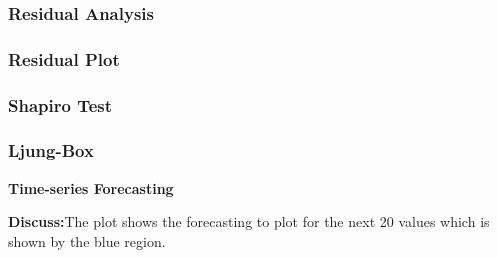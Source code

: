 \documentclass[
  onepage,
  openany]{scrbook}
\newenvironment{Shaded}{}{}
\newcommand{\AttributeTok}[1]{\textcolor[rgb]{0.49,0.56,0.16}{#1}}
\newcommand{\CommentTok}[1]{\textcolor[rgb]{0.38,0.63,0.69}{\textit{#1}}}
\newcommand{\DecValTok}[1]{\textcolor[rgb]{0.25,0.63,0.44}{#1}}
\newcommand{\FunctionTok}[1]{\textcolor[rgb]{0.02,0.16,0.49}{#1}}
\newcommand{\NormalTok}[1]{#1}
\newcommand{\OtherTok}[1]{\textcolor[rgb]{0.00,0.44,0.13}{#1}}
\newcommand{\SpecialCharTok}[1]{\textcolor[rgb]{0.25,0.44,0.63}{#1}}
\begin{document}
\hypertarget{residual-analysis}{%
\subsubsection{\texorpdfstring{\textbf{Residual
Analysis}}{Residual Analysis}}\label{residual-analysis}}

\hypertarget{residual-plot}{%
\subsubsection{\texorpdfstring{\textbf{Residual
Plot}}{Residual Plot}}\label{residual-plot}}

\hypertarget{shapiro-test}{%
\subsubsection{\texorpdfstring{\textbf{Shapiro
Test}}{Shapiro Test}}\label{shapiro-test}}

\hypertarget{ljung-box}{%
\subsubsection{\texorpdfstring{\textbf{Ljung-Box}}{Ljung-Box}}\label{ljung-box}}

\textbf{Time-series Forecasting}

\textbf{Discuss:}The plot shows the forecasting to plot for the next 20
values which is shown by the blue region.

\begin{Shaded}
\end{Shaded}
\end{document}
